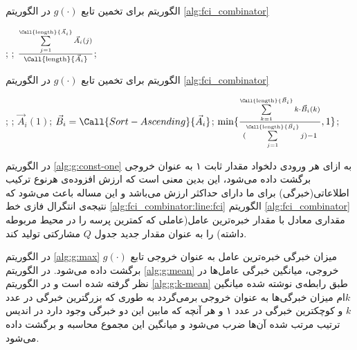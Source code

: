 \begin{algorithm}[t]
\caption{الگوریتم  برای تخمین تابع $g(\cdot)$ در الگوریتم \ref{alg:fci_combinator}}\label{alg:g:mean}
\begin{latin}
\begin{algorithmic}[1]
		\State {};
		\State {};
	\Else
		\State \Return ${\sum\limits_{j=1}^{\Call{\text{length}}{\vec{A}_i}} \vec{A}_i(j) \over \Call{\text{length}}{\vec{A}_i}}$;
	\EndIf
\EndFunction
\end{algorithmic}
\end{latin}
\end{algorithm}

\begin{algorithm}[t]
\caption{الگوریتم  برای تخمین تابع $g(\cdot)$ در الگوریتم \ref{alg:fci_combinator}}\label{alg:g:k-mean}
\begin{latin}
\begin{algorithmic}[1]
		\State {};
		\State {};
		\State \Return $\vec{A}_i(1)$;
	\Else
		\State $\vec{B}_i = \Call{Sort-Ascending}{\vec{A}_i}$;
		\State \Return $\min\{{\sum\limits_{k = 1}^{\Call{\text{length}}{\vec{B}_i}}  k \cdot \vec{B}_i(k) \over {(\sum\limits_{j=1}^{\Call{\text{length}}{\vec{B}_i}} j) - 1}}, 1\}$;
	\EndIf
\EndFunction
\end{algorithmic}
\end{latin}
\end{algorithm}

در الگوریتم \ref{alg:g:const-one} به ازای هر ورودی دلخواد مقدار ثابت ۱ به عنوان خروجی برگشت داده می‌شود، این بدین معنی است که ارزش افزوده‌ی هرنوع ترکیب اطلاعاتی(خبرگی) برای ما دارای حداکثر ارزش می‌باشد و این مساله باعث می‌شود که نتیجه‌ی انتگرال فازی خط \ref{alg:fci_combinator:line:fci} الگوریتم \ref{alg:fci_combinator} مقداری معادل با مقدار خبره‌ترین عامل(عاملی که کمترین پرسه را در محیط مربوطه داشته) را به عنوان مقدار جدید جدول $Q$ مشارکتی تولید کند.

در الگوریتم \ref{alg:g:max} میزان خبرگی خبره‌ترین عامل به عنوان خروجی تابع $g(\cdot)$ برگشت داده می‌شود. در الگوریتم \ref{alg:g:mean} خروجی، میانگین خبرگی عامل‌ها در نظر گرفته شده است و در الگوریتم \ref{alg:g:k-mean} طبق رابطه‌ی نوشته شده میانگین $k$ام میزان خبرگی‌ها به عنوان خروجی برمی‌گردد به طوری که بزرگترین خبرگی در عدد $k$ و کوچکترین خبرگی در عدد ۱ و هر آنچه که مابین این دو خبرگی وجود دارد در اندیس ترتیب مرتب شده آن‌ها ضرب می‌شود و میانگین این مجموع محاسبه و برگشت داده می‌شود.